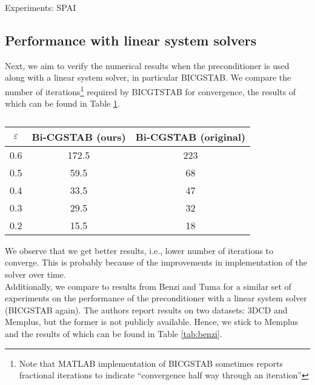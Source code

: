 \documentclass[paper=A4, fontsize=11pt]{scrartcl}
\theoremstyle{remark}
\begin{document}
\begin{section}{Experiments: SPAI}
\subsection{Performance with linear system solvers}
Next, we aim to verify the numerical results when the preconditioner is used along with a linear system solver, in particular BICGSTAB. We compare the number of iterations\footnote{Note that MATLAB implementation of BICGSTAB sometimes reports fractional iterations to indicate ``convergence half way through an iteration''} required by BICGTSTAB for convergence, the results of which can be found in Table \ref{tab:grote1}. 
\begin{table}[h]
	\centering
	\begin{tabular}{@{}ccc@{}}
		\toprule
		$\varepsilon$ & Bi-CGSTAB (ours) & Bi-CGSTAB (original)\\
		\midrule
		0.6    &   172.5       & 223\\     
		0.5    &   59.5        & 68\\    
		0.4    &   33.5        &47 \\    
		0.3    &   29.5        & 32 \\    
		0.2    &   15.5 & 18 \\
		\bottomrule
	\end{tabular}
	\caption{}
	\label{tab:grote1}
\end{table}

We observe that we get better results, i.e., lower number of iterations to converge. This is probably because of the improvements in implementation of the solver over time. \\

Additionally, we compare to results from Benzi and Tuma \cite{benzi} for a similar set of experiments on the performance of the preconditioner with a linear system solver (BICGSTAB again). The authors \cite{benzi} report results on two datasets: 3DCD and Memplus, but the former is not publicly available. Hence, we stick to Memplus and the results of which can be found in Table \ref{tab:benzi}.


\end{section}
\end{document}
